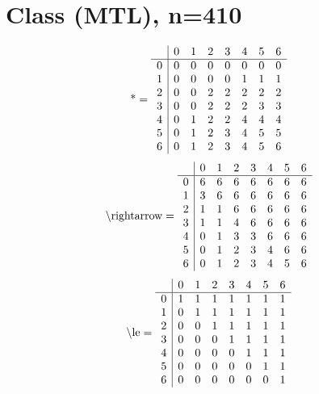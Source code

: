 \documentclass[11pt]{article}
\begin{document}
\section{Class (MTL), n=410}
\[\text{*} = 
\begin{array}{r | r r r r r r r}
 & 0 & 1 & 2 & 3 & 4 & 5 & 6 \\ \hline
0 & 0 & 0 & 0 & 0 & 0 & 0 & 0 \\
1 & 0 & 0 & 0 & 0 & 1 & 1 & 1 \\
2 & 0 & 0 & 2 & 2 & 2 & 2 & 2 \\
3 & 0 & 0 & 2 & 2 & 2 & 3 & 3 \\
4 & 0 & 1 & 2 & 2 & 4 & 4 & 4 \\
5 & 0 & 1 & 2 & 3 & 4 & 5 & 5 \\
6 & 0 & 1 & 2 & 3 & 4 & 5 & 6 \\
\end{array}
\]
\[\text{\textbackslash rightarrow} = 
\begin{array}{r | r r r r r r r}
 & 0 & 1 & 2 & 3 & 4 & 5 & 6 \\ \hline
0 & 6 & 6 & 6 & 6 & 6 & 6 & 6 \\
1 & 3 & 6 & 6 & 6 & 6 & 6 & 6 \\
2 & 1 & 1 & 6 & 6 & 6 & 6 & 6 \\
3 & 1 & 1 & 4 & 6 & 6 & 6 & 6 \\
4 & 0 & 1 & 3 & 3 & 6 & 6 & 6 \\
5 & 0 & 1 & 2 & 3 & 4 & 6 & 6 \\
6 & 0 & 1 & 2 & 3 & 4 & 5 & 6 \\
\end{array}
\]
\[\text{\textbackslash le} = 
\begin{array}{r | r r r r r r r}
 & 0 & 1 & 2 & 3 & 4 & 5 & 6 \\ \hline
0 & 1 & 1 & 1 & 1 & 1 & 1 & 1 \\
1 & 0 & 1 & 1 & 1 & 1 & 1 & 1 \\
2 & 0 & 0 & 1 & 1 & 1 & 1 & 1 \\
3 & 0 & 0 & 0 & 1 & 1 & 1 & 1 \\
4 & 0 & 0 & 0 & 0 & 1 & 1 & 1 \\
5 & 0 & 0 & 0 & 0 & 0 & 1 & 1 \\
6 & 0 & 0 & 0 & 0 & 0 & 0 & 1 \\
\end{array}
\]
\end{document}
